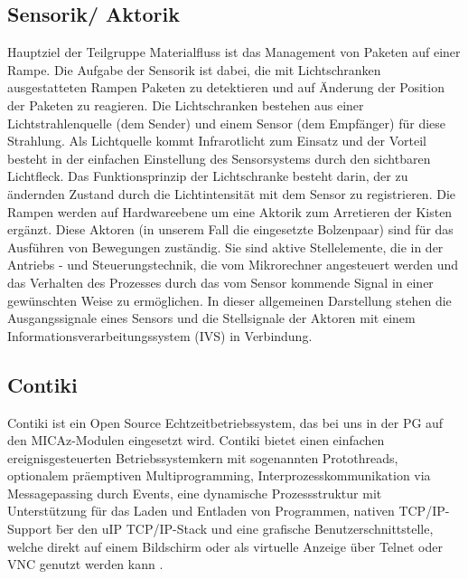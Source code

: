 \subsection{Sensorik/ Aktorik}
Hauptziel der Teilgruppe Materialfluss ist das Management von Paketen auf einer Rampe. Die Aufgabe der Sensorik ist dabei, die mit Lichtschranken ausgestatteten Rampen Paketen zu detektieren und auf \"Anderung der Position der Paketen zu reagieren. Die Lichtschranken bestehen aus einer Lichtstrahlenquelle (dem Sender) und einem Sensor (dem Empf\"anger) f\"{u}r diese Strahlung. Als Lichtquelle kommt Infrarotlicht zum Einsatz und der Vorteil besteht in der einfachen Einstellung des Sensorsystems durch den sichtbaren Lichtfleck. Das Funktionsprinzip der Lichtschranke besteht darin, der zu  \"andernden Zustand durch die Lichtintensit\"at mit dem Sensor zu registrieren. 
Die Rampen werden auf Hardwareebene um eine Aktorik zum Arretieren der Kisten erg\"anzt. Diese Aktoren (in unserem Fall die eingesetzte Bolzenpaar) sind f\"ur das Ausf\"uhren von Bewegungen zust\"andig. Sie sind aktive Stellelemente, die in der Antriebs - und Steuerungstechnik, die vom  Mikrorechner angesteuert werden und das Verhalten des Prozesses durch das vom Sensor kommende Signal in einer gew\"{u}nschten Weise zu erm\"oglichen. In dieser allgemeinen Darstellung stehen die Ausgangssignale eines Sensors und die Stellsignale der Aktoren mit einem
Informationsverarbeitungssystem (IVS) in Verbindung.

\subsection{Contiki}
Contiki ist ein Open Source Echtzeitbetriebssystem, das bei uns in der PG auf den MICAz-Modulen eingesetzt wird.
Contiki bietet einen einfachen ereignisgesteuerten Betriebssystemkern mit sogenannten Protothreads, optionalem pr\"aemptiven Multiprogramming, Interprozesskommunikation via Messagepassing durch Events, eine dynamische Prozessstruktur mit Unterst\"utzung f\"ur das Laden und Entladen von Programmen, nativen TCP/IP-Support \"ber den uIP TCP/IP-Stack und eine grafische Benutzerschnittstelle, welche direkt auf einem Bildschirm oder als virtuelle Anzeige \"uber Telnet oder VNC genutzt werden kann \cite{Wikipedia:2013:Online}.
 
